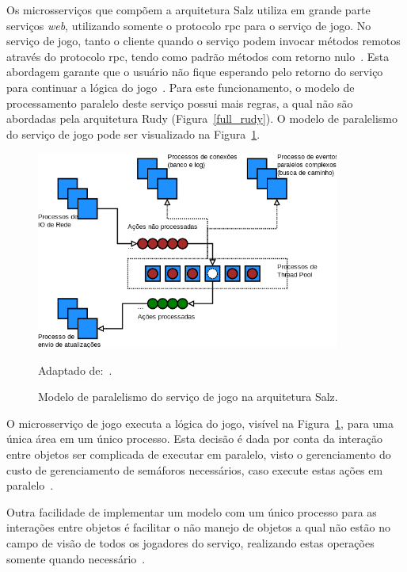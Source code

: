 Os microsserviços que compõem a arquitetura Salz utiliza em grande parte serviços \textit{web}, utilizando somente o protocolo \ac{rpc} para o serviço de jogo.
%
No serviço de jogo, tanto o cliente quando o serviço podem invocar métodos remotos através do protocolo \ac{rpc}, tendo como padrão métodos com retorno nulo~\cite{salz_albion, photon_serialization}.
%
Esta abordagem garante que o usuário não fique esperando pelo retorno do serviço para continuar a lógica do jogo~\cite{faber}.
%
Para este funcionamento, o modelo de processamento paralelo deste serviço possui mais regras, a qual não são abordadas pela arquitetura Rudy (Figura~\ref{full_rudy}).
%
O modelo de paralelismo do serviço de jogo pode ser visualizado na Figura~\ref{salz_thread_model}.


\begin{figure}[htb!]
  \caption{Modelo de paralelismo do serviço de jogo na arquitetura Salz.}
  \label{salz_thread_model}
  \includegraphics[height=6.5cm]{arquiteturas/salz_thread_model.png}
  \centering

  Adaptado de:~\cite{salz_albion, willson}.
\end{figure}



O microsserviço de jogo executa a lógica do jogo, visível na Figura~\ref{salz_thread_model}, para uma única área em um único processo.
%
Esta decisão é dada por conta da interação entre objetos ser complicada de executar em paralelo, visto o gerenciamento do custo de gerenciamento de semáforos necessários, caso execute estas ações em paralelo~\cite{salz_albion}.



Outra facilidade de implementar um modelo com um único processo para as interações entre objetos é facilitar o não manejo de objetos a qual não estão no campo de visão de todos os jogadores do serviço, realizando estas operações somente quando necessário~\cite{albion_online_unite, salz_albion}.


